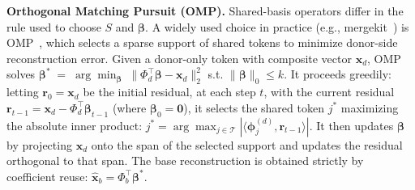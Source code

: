 \noindent\textbf{Orthogonal Matching Pursuit (OMP).} Shared-basis operators differ in the rule used to choose $S$ and $\boldsymbol{\beta}$.
A widely used choice in practice (e.g., mergekit~\citep{mergekit2024}) is OMP~\citep{pati1993orthogonal,goddard2025tftransplant}, which selects a sparse support of shared tokens to minimize donor-side reconstruction error. Given a donor-only token with composite vector $\mathbf{x}_d$, OMP solves
$
\boldsymbol{\beta}^*\;=\; \arg\min_{\boldsymbol{\beta}}\;\big\|\Phi_d^\top\boldsymbol{\beta}-\mathbf{x}_d\big\|_2^2
$
s.t.
$  \|\boldsymbol{\beta}\|_0\le k.
$
It proceeds greedily: letting $\mathbf{r}_{0} = \mathbf{x}_d$ be the initial residual, at each step $t$, with the current residual $\mathbf{r}_{t-1} = \mathbf{x}_d - \Phi_d^\top \boldsymbol{\beta}_{t-1}$ (where $\boldsymbol{\beta}_0=\mathbf{0}$), it selects the shared token $j^*$ maximizing the absolute inner product:
$
j^* = \arg\max_{j \in \mathcal{T}} |\langle \boldsymbol{\phi}^{(d)}_j, \mathbf{r}_{t-1} \rangle|.
$
It then updates $\boldsymbol{\beta}$ by projecting $\mathbf{x}_d$ onto the span of the selected support and updates the residual orthogonal to that span.
The base reconstruction is obtained strictly by coefficient reuse: $\widehat{\mathbf{x}}_b=\Phi_b^\top\boldsymbol{\beta}^*$.




